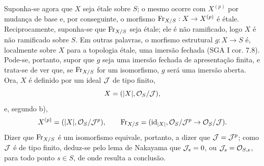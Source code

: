 Suponha-se agora que $X$ seja étale sobre $S$; o mesmo ocorre com $X^{(p)}$ por mudança de base e, por conseguinte, o morfismo $\operatorname{Fr}_{X/S}:X\to X^{(p)}$ é étale. Reciprocamente, suponha-se que $\operatorname{Fr}_{X/S}$ seja étale; ele é não ramificado, logo $X$ é não ramificado sobre $S$. Em outras palavras, o morfismo estrutural $g:X\to S$ é, localmente sobre $X$ para a topologia étale, uma imersão fechada (SGA I cor. 7.8). Pode-se, portanto, supor que $g$ seja uma imersão fechada de apresentação finita, e trata-se de ver que, se $\operatorname{Fr}_{X/S}$ for um isomorfismo, $g$ será uma imersão aberta. Ora, $X$ é definido por um ideal $\mathcal J$ de tipo finito,
\[
X=(|X|,\mathcal{O}_S/\mathcal J),
\]
e, segundo b),
\[
X^{(p)}=(|X|,\mathcal{O}_S/\mathcal J^p),
\qquad
\operatorname{Fr}_{X/S}=(\operatorname{id}_{|X|},\mathcal{O}_S/\mathcal J^p\to\mathcal{O}_S/\mathcal J).
\]
Dizer que $\operatorname{Fr}_{X/S}$ é um isomorfismo equivale, portanto, a dizer que $\mathcal J=\mathcal J^p$; como $\mathcal J$ é de tipo finito, deduz-se pelo lema de Nakayama que $\mathcal J_s=0$, ou $\mathcal J_s=\mathcal{O}_{S,s}$, para todo ponto $s\in S$, de onde resulta a conclusão.
